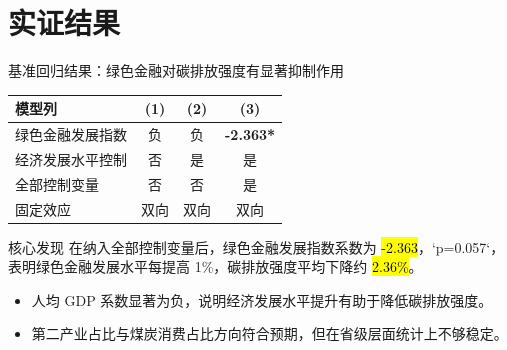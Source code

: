 \section{实证结果}

\begin{frame}{基准回归结果：绿色金融对碳排放强度有显著抑制作用}
  \begin{table}
    \centering
    \small
    \begin{tabular}{@{}lccc@{}}
      \toprule
      模型列 & (1) & (2) & (3) \\
      \midrule
      绿色金融发展指数 & 负 & 负 & \textbf{-2.363*} \\
      经济发展水平控制 & 否 & 是 & 是 \\
      全部控制变量 & 否 & 否 & 是 \\
      固定效应 & 双向 & 双向 & 双向 \\
      \bottomrule
    \end{tabular}
  \end{table}

  \begin{alertblock}{核心发现}
    在纳入全部控制变量后，绿色金融发展指数系数为 \hl{-2.363}，`p=0.057`，
    表明绿色金融发展水平每提高 1\%，碳排放强度平均下降约 \hl{2.36\%}。
  \end{alertblock}

  \begin{itemize}
    \item 人均 GDP 系数显著为负，说明经济发展水平提升有助于降低碳排放强度。
    \item 第二产业占比与煤炭消费占比方向符合预期，但在省级层面统计上不够稳定。
  \end{itemize}
\end{frame}

